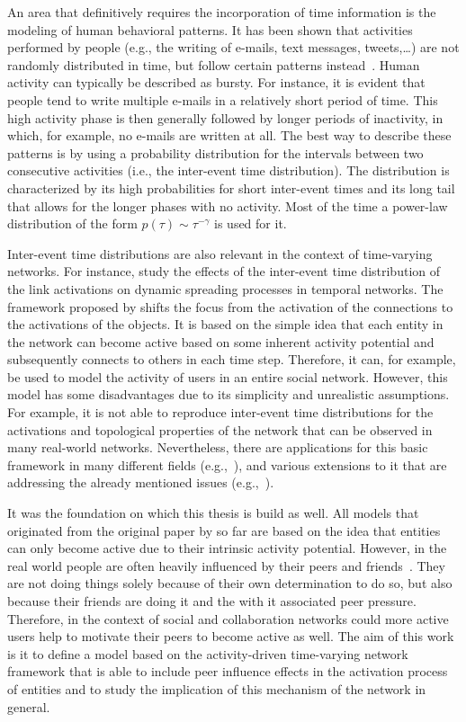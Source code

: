 An area that definitively requires the incorporation of time information is the modeling of human behavioral patterns.
It has been shown that activities performed by people (e.g., the writing of e-mails, text messages, tweets,\ldots) are not randomly distributed in time, but follow certain patterns instead~\cite{Barabasi2005}.
Human activity can typically be described as bursty.
For instance, it is evident that people tend to write multiple e-mails in a relatively short period of time.
This high activity phase is then generally followed by longer periods of inactivity, in which, for example, no e-mails are written at all.
The best way to describe these patterns is by using a probability distribution for the intervals between two consecutive activities (i.e., the inter-event time distribution).
The distribution is characterized by its high probabilities for short inter-event times and its long tail that allows for the longer phases with no activity.
Most of the time a power-law distribution of the form \( p(\tau) \sim \tau^{-\gamma} \) is used for it.

Inter-event time distributions are also relevant in the context of time-varying networks.
For instance, \citet{Lambiotte2013} study the effects of the inter-event time distribution of the link activations on dynamic spreading processes in temporal networks.
The framework proposed by \citet{Perra2012a} shifts the focus from the activation of the connections to the activations of the objects.
It is based on the simple idea that each entity in the network can become active based on some inherent activity potential and subsequently connects to others in each time step.
Therefore, it can, for example, be used to model the activity of users in an entire social network.
However, this model has some disadvantages due to its simplicity and unrealistic assumptions.
For example, it is not able to reproduce inter-event time distributions for the activations and topological properties of the network that can be observed in many real-world networks.
Nevertheless, there are applications for this basic framework in many different fields (e.g.,~\cite{Rizzo2014, Rizzo2016}), and various extensions to it that are addressing the already mentioned issues (e.g.,~\cite{Laurent2015, Moinet2015, Moinet2016}).

It was the foundation on which this thesis is build as well.
All models that originated from the original paper by \citet{Perra2012a} so far are based on the idea that entities can only become active due to their intrinsic activity potential.
However, in the real world people are often heavily influenced by their peers and friends~\cite{Walk2016}.
They are not doing things solely because of their own determination to do so, but also because their friends are doing it and the with it associated peer pressure.
Therefore, in the context of social and collaboration networks could more active users help to motivate their peers to become active as well.
The aim of this work is it to define a model based on the activity-driven time-varying network framework that is able to include peer influence effects in the activation process of entities and to study the implication of this mechanism of the network in general.


